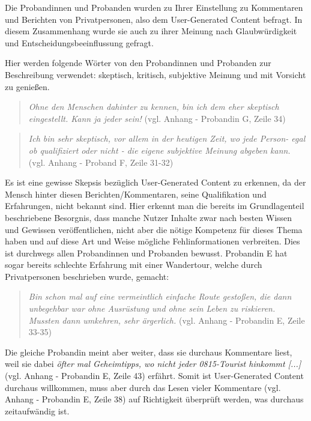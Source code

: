 Die Probandinnen und Probanden wurden zu Ihrer Einstellung zu Kommentaren und Berichten von Privatpersonen, also dem User-Generated Content befragt. In diesem Zusammenhang wurde sie auch zu ihrer Meinung nach Glaubwürdigkeit und Entscheidungsbeeinflussung gefragt.

Hier werden folgende Wörter von den Probandinnen und Probanden zur Beschreibung verwendet: skeptisch, kritisch, subjektive Meinung und mit Vorsicht zu genießen.

\begin{quote}
	\textit{\glqq Ohne den Menschen dahinter zu kennen, bin ich dem eher skeptisch eingestellt. Kann ja jeder sein!\grqq} (vgl. Anhang - Probandin G, Zeile 34)
\end{quote}

\begin{quote}
	\textit{\glqq Ich bin sehr skeptisch, vor allem in der heutigen Zeit, wo jede Person- egal ob qualifiziert oder nicht - die eigene subjektive Meinung abgeben kann.\grqq} (vgl. Anhang - Proband F, Zeile 31-32)
\end{quote}

Es ist eine gewisse Skepsis bezüglich User-Generated Content zu erkennen, da der Mensch hinter diesen Berichten/Kommentaren, seine Qualifikation und Erfahrungen, nicht bekannt sind. Hier erkennt man die bereits im Grundlagenteil beschriebene Besorgnis, dass manche Nutzer Inhalte zwar nach besten Wissen und Gewissen veröffentlichen, nicht aber die nötige Kompetenz für dieses Thema haben und auf diese Art und Weise mögliche Fehlinformationen verbreiten. Dies ist durchwegs allen Probandinnen und Probanden bewusst. Probandin E hat sogar bereits schlechte Erfahrung mit einer Wandertour, welche durch Privatpersonen beschrieben wurde, gemacht:

\begin{quote}
	\textit{\glqq Bin schon mal auf eine vermeintlich einfache Route gestoßen, die dann unbegehbar war ohne Ausrüstung und ohne sein Leben zu riskieren. Mussten dann umkehren, sehr ärgerlich.\grqq} (vgl. Anhang - Probandin E, Zeile 33-35)
\end{quote}

Die gleiche Probandin meint aber weiter, dass sie durchaus Kommentare liest, weil sie dabei \textit{\glqq [...] öfter mal Geheimtipps, wo nicht jeder 0815-Tourist hinkommt [...]}\grqq (vgl. Anhang - Probandin E, Zeile 43) erfährt. Somit ist User-Generated Content durchaus willkommen, muss aber durch das Lesen vieler Kommentare (vgl. Anhang - Probandin E, Zeile 38) auf Richtigkeit überprüft werden, was durchaus zeitaufwändig ist.


